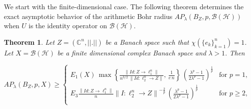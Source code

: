 \documentclass[a4paper,11pt, reqno]{amsart}
\newtheorem{thm}{Theorem}[section]
\theoremstyle{definition}
\newcommand{\real}{{\operatorname{Re}\,}}
\newcommand{\norm}[1]{\left\lVert#1\right\rVert}
\newcommand{\comment}[1]{}
\begin{document}
	 We start with the finite-dimensional case. The following theorem determines the exact asymptotic behavior of the arithmetic Bohr radius $AP_\lambda(B_{Z},p,\mathcal{B}(\mathcal{H}))$ when $U$ is the identity operator on $\mathcal{B}(\mathcal{H})$.
	\begin{thm} \label{thm-1.2-atm}
		Let $Z=(\mathbb{C}^n, ||.||)$ be a Banach space such that $\chi(\{e_k\}^n_{k=1})=1$. Let $X=\mathcal{B}(\mathcal{H})$ be a finite dimensional complex Banach space and $\lambda>1$. Then 
		\comment{\begin{equation}
				R^{m}_{\lambda}(B_{Z}, p) \geq	\begin{cases}
					E_{1}(X)\, \lambda^{\frac{1}{m}} \, \max \left\{\frac{1}{\sqrt{n}\, \norm{Id: \ell^n_{2} \rightarrow Z}}, \, \frac{1}{\left(\frac{m^m}{m!}\right)^{1/m}\, \norm{Id: Z \rightarrow \ell^n_{1}}}\right\} & \text{for $p=1$}, \\[3mm]
					2^{-\frac{p+5}{pm}}\,  \lambda^{\frac{1}{m}}\, \norm{I:\ell^n _2 \rightarrow Z}^{-\frac{2}{p}} \,\norm{I-\real (a_{0})}^{-\frac{2}{pm}} & \text{for $p \geq 2$}, \\[2mm]
					
					E_{2}(X)\, \lambda^{\frac{1}{m}} \,\max \left\{\frac{1}{(\sqrt{n})^{1-\theta}\, \norm{Id: \ell^n_{2} \rightarrow Z}}, \, \frac{\norm{I:\ell^n _2 \rightarrow Z}^{-\theta}}{\left(\frac{m^m}{m!}\right)^{(1-\theta)/m}\, \norm{Id: Z \rightarrow \ell^n_{1}}^{1-\theta}}\right\} & \text{for $1<p< 2$}, 
				\end{cases}
			\end{equation}
			where $\theta=(2(p-1))/p$. Moreover,}
		\begin{equation*}
			AP_{\lambda}(B_{Z}, p,X) \geq	\begin{cases}
				E_{1}(X)\,  \max \left\{\frac{\norm{Id: Z \rightarrow \ell^n_{1}}}{n^{3/2}\, \norm{Id: \ell^n_{2} \rightarrow Z}}, \, \frac{1}{e\,n}\right\}\, \left(\frac{\lambda^p -1}{2\lambda^p - 1}\right)^{\frac{1}{p}} & \text{for $p=1$}, \\[2mm]
				E_{3} \frac{\norm{Id: Z \rightarrow \ell^n_{1}}}{n}\norm{I:\ell^n _2 \rightarrow Z}^{-\frac{2}{p}}\, \left(\frac{\lambda^p -1}{2\lambda^p - 1}\right)^{\frac{1}{p}}\, & \text{for $p \geq 2$}, \\[2mm]
				

\end{cases}
\end{equation*}
\end{thm}
\end{document}
